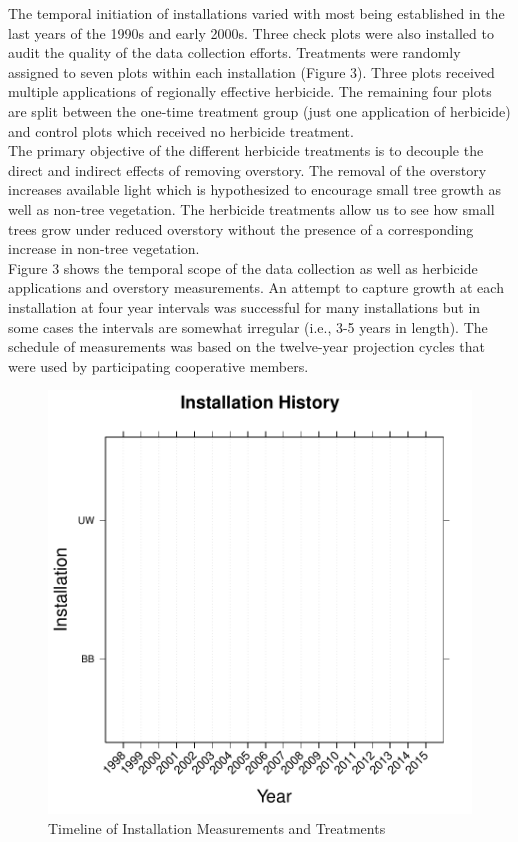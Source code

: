 \documentclass[11pt, letterpaper, fleqn]{article}
\begin{document}
The temporal initiation of installations varied with most being established in the last years of the 1990s and early 2000s.  Three check plots were also installed to audit the quality of the data collection efforts. Treatments were randomly assigned to seven plots within each installation (Figure 3).  Three plots received multiple applications of regionally effective herbicide.  The remaining four plots are split between the one-time treatment group (just one application of herbicide) and control plots which received no herbicide treatment.\\[2pt]

The primary objective of the different herbicide treatments is to decouple the direct and indirect effects of removing overstory. The removal of the overstory increases available light which is hypothesized to encourage small tree growth as well as non-tree vegetation.  The herbicide treatments allow us to see how small trees grow under reduced overstory without the presence of a corresponding increase in non-tree vegetation.\\[2pt]

Figure 3 shows the temporal scope of the data collection as well as herbicide applications and overstory measurements. An attempt to capture growth at each installation at four year intervals was successful for many installations but in some cases the intervals are somewhat irregular (i.e., 3-5 years in length). The schedule of measurements was based on the twelve-year projection cycles that were used by participating cooperative members.\\[2pt]
\begin{figure}
\begin{center}

\includegraphics{Thesis_doc-timeline}
\end{center}
\caption{Timeline of Installation Measurements and Treatments}
\end{figure}
\end{document}
